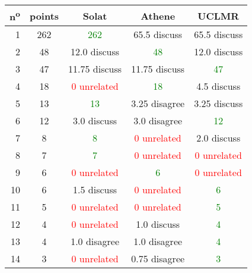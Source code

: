 \begin{center}
 \begin{tabular}{ r | c || c c c }
  n\textsuperscript{o} & points & Solat                        & Athene                       & UCLMR                        \\ \hline
  1                    & 262    & \textcolor{green}{262}       & 65.5 discuss                 & 65.5 discuss                 \\
  2                    & 48     & 12.0 discuss                 & \textcolor{green}{48}        & 12.0 discuss                 \\
  3                    & 47     & 11.75 discuss                & 11.75 discuss                & \textcolor{green}{47}        \\
  4                    & 18     & \textcolor{red}{0 unrelated} & \textcolor{green}{18}        & 4.5 discuss                  \\
  5                    & 13     & \textcolor{green}{13}        & 3.25 disagree                & 3.25 discuss                 \\
  6                    & 12     & 3.0 discuss                  & 3.0 disagree                 & \textcolor{green}{12}        \\
  7                    & 8      & \textcolor{green}{8}         & \textcolor{red}{0 unrelated} & 2.0 discuss                  \\
  8                    & 7      & \textcolor{green}{7}         & \textcolor{red}{0 unrelated} & \textcolor{red}{0 unrelated} \\
  9                    & 6      & \textcolor{red}{0 unrelated} & \textcolor{green}{6}         & \textcolor{red}{0 unrelated} \\
  10                   & 6      & 1.5 discuss                  & \textcolor{red}{0 unrelated} & \textcolor{green}{6}         \\
  11                   & 5      & \textcolor{red}{0 unrelated} & \textcolor{red}{0 unrelated} & \textcolor{green}{5}         \\
  12                   & 4      & \textcolor{red}{0 unrelated} & 1.0 discuss                  & \textcolor{green}{4}         \\
  13                   & 4      & 1.0 disagree                 & 1.0 disagree                 & \textcolor{green}{4}         \\
  14                   & 3      & \textcolor{red}{0 unrelated} & 0.75 disagree                & \textcolor{green}{3}         \\

\end{tabular}
\end{center}
